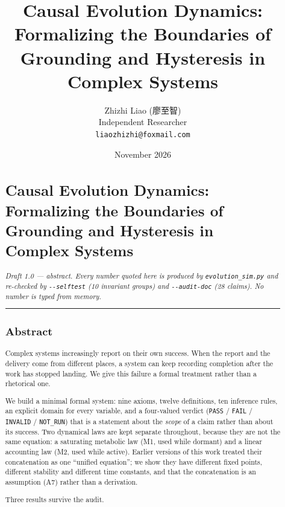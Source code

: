 \documentclass[11pt,a4paper]{article}
\title{\bfseries Causal Evolution Dynamics: Formalizing the Boundaries of Grounding and Hysteresis in Complex Systems}
\author{Zhizhi Liao (廖至智) \\
Independent Researcher \\
\texttt{liaozhizhi@foxmail.com}}
\date{November 2026}
\begin{document}
\maketitle

\begin{abstract}
\section{Causal Evolution Dynamics: Formalizing the Boundaries of Grounding and Hysteresis in Complex Systems}\label{causal-evolution-dynamics-formalizing-the-boundaries-of-grounding-and-hysteresis-in-complex-systems}

\emph{Draft 1.0 --- abstract. Every number quoted here is produced by
\texttt{evolution\_sim.py} and re-checked by \texttt{-\/-selftest} (10 invariant groups) and
\texttt{-\/-audit-doc} (28 claims). No number is typed from memory.}

\begin{center}\rule{0.5\linewidth}{0.5pt}\end{center}

\subsection{Abstract}\label{abstract}

Complex systems increasingly report on their own success. When the report and
the delivery come from different places, a system can keep recording completion
after the work has stopped landing. We give this failure a formal treatment
rather than a rhetorical one.

We build a minimal formal system: nine axioms, twelve definitions, ten
inference rules, an explicit domain for every variable, and a four-valued
verdict (\texttt{PASS} / \texttt{FAIL} / \texttt{INVALID} / \texttt{NOT\_RUN}) that is a statement about the
\emph{scope} of a claim rather than about its success. Two dynamical laws are kept
separate throughout, because they are not the same equation: a saturating
metabolic law (M1, used while dormant) and a linear accounting law (M2, used
while active). Earlier versions of this work treated their concatenation as one
``unified equation''; we show they have different fixed points, different
stability and different time constants, and that the concatenation is an
assumption (A7) rather than a derivation.

Three results survive the audit.


\end{abstract}
\end{document}
